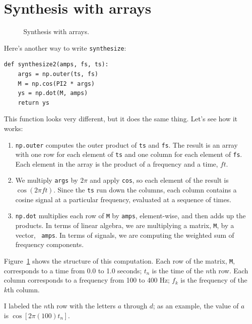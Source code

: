 \documentclass[12pt]{book}
\begin{document}
\section{Synthesis with arrays}
\label{synthesis}

\begin{figure}

\caption{Synthesis with arrays.}
\label{fig.synthesis}
\end{figure}

Here's another way to write {\tt synthesize}:

\begin{verbatim}
def synthesize2(amps, fs, ts):
    args = np.outer(ts, fs)
    M = np.cos(PI2 * args)
    ys = np.dot(M, amps)
    return ys
\end{verbatim}

This function looks very different, but it does the same thing.
Let's see how it works:

\begin{enumerate}

\item {\tt np.outer} computes the outer product of {\tt ts} and
  {\tt fs}.  The result is an array with one row for each element
  of {\tt ts} and one column for each element of {\tt fs}.  Each
  element in the array is the product of a frequency and a time, $f
  t$.

\item We multiply {\tt args} by $2 \pi$ and apply {\tt cos}, so each
  element of the result is $\cos (2 \pi f t)$.  Since the {\tt ts} run
  down the columns, each column contains a cosine signal at a
  particular frequency, evaluated at a sequence of times.

\item {\tt np.dot} multiplies each row of {\tt M} by {\tt amps},
  element-wise, and then adds up the products.  In terms of linear
  algebra, we are multiplying a matrix, {\tt M}, by a vector, {\tt
    amps}.  In terms of signals, we are computing the weighted sum
  of frequency components.

\end{enumerate}

Figure~\ref{fig.synthesis} shows the structure of this computation.
Each row of the matrix, {\tt M}, corresponds to a time 
from 0.0 to 1.0 seconds; $t_n$ is the time of the $n$th row.
Each column corresponds to a frequency from
100 to 400 Hz; $f_k$ is the frequency of the $k$th column.

I labeled the $n$th row with the letters $a$ through $d$; as an
example, the value of $a$ is $\cos [2 \pi (100) t_n]$.
\end{document}
